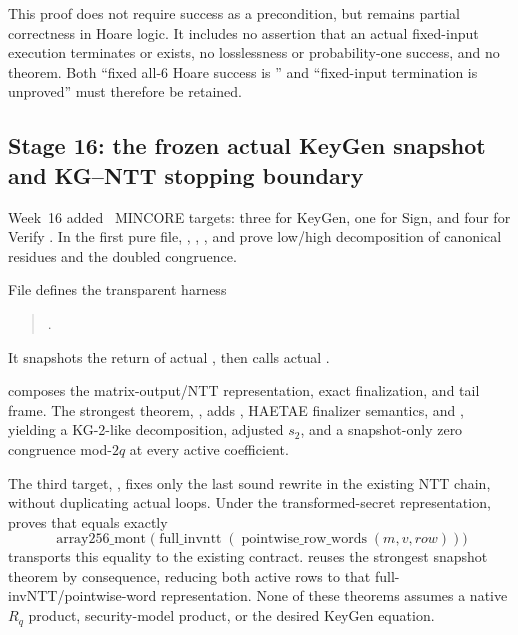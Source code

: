 This proof does not require success as a precondition, but remains partial
correctness in Hoare logic. It includes no assertion that an actual fixed-input
execution terminates or exists, no losslessness or probability-one success,
and no  theorem.
Both “fixed all-6 Hoare success is \statusproved” and “fixed-input termination
is unproved” must therefore be retained.

\subsection{Stage 16: the frozen actual KeyGen snapshot and KG--NTT stopping boundary}

Week~16 added \WeekSixteenTargetCount\ MINCORE targets: three for KeyGen,
one for Sign, and four for Verify
\cite{week16-mincore-plan,week16-kg-report,week16-kg-ntt-mul-report,
week16-sign-report,week16-verify-report}.
In the first pure file,
%
\allowbreak{},
,
, and
prove low/high decomposition of canonical residues and the doubled congruence.

File  defines the transparent harness
\begin{quote}
.
\end{quote}
It snapshots the return of actual
, then calls actual
.

\begin{verified}
 composes the matrix-output/NTT
representation, exact finalization, and tail frame.
The strongest theorem,
, adds
, HAETAE finalizer
semantics, and ,
yielding a KG-2-like decomposition, adjusted \(s_2\), and a snapshot-only
zero congruence mod-\(2q\) at every active coefficient.
\end{verified}

The third target, , fixes only the
last sound rewrite in the existing NTT chain, without duplicating actual loops.
Under the transformed-secret representation,
 proves that
 equals exactly
\[
  \operatorname{array256\_mont}
  \bigl(\operatorname{full\_invntt}
    (\operatorname{pointwise\_row\_words}(m,v,row))\bigr)
\]
 transports this equality
to the existing  contract.
 reuses the strongest
snapshot theorem by consequence, reducing both active rows to that
full-invNTT/pointwise-word representation.
None of these theorems assumes a native \(R_q\) product, security-model product,
or the desired KeyGen equation.

